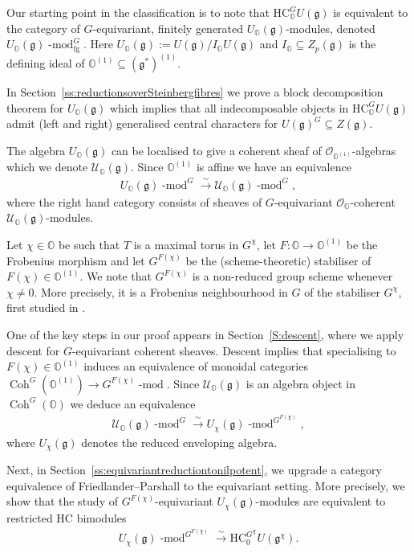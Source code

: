 \documentclass[twoside,12pt,reqno]{amsart}
\theoremstyle{remark}
\numberwithin{equation}{section}
\def\isoto{\overset{\sim}{\longrightarrow}}
\def\lmod{\!\operatorname{-mod}}
\def\Coh{\operatorname{Coh}}
\def\O{{\mathbb O}}
\def\HC{\mathrm{HC}}
\def\g{{\mathfrak g}}
\def\U{\mathcal{U}}
\def\Oc{\mathcal{O}}
\newcommand{\fg}{\operatorname{fg}}
\begin{document}
Our starting point in the classification is to note that $\HC_\O^G U(\g)$ is equivalent to the category of $G$-equivariant, finitely generated $U_\O(\g)$-modules, denoted $U_\O(\g)\lmod^G_{\fg}$. Here $U_\O(\g) := U(\g) / I_\O U(\g)$ and $I_\O \subseteq Z_p(\g)$ is the defining ideal of $\O^{(1)} \subseteq (\g^*)^{(1)}$.

In Section~\ref{ss:reductionsoverSteinbergfibres} we prove a block decomposition theorem for $U_\O(\g)$ which implies that all indecomposable objects in $\HC_\O^G U(\g)$ admit (left and right) generalised central characters for $U(\g)^G \subseteq Z(\g)$.

The algebra $U_\O(\g)$ can be localised to give a coherent sheaf of $\Oc_{\O^{(1)}}$-algebras which we denote $\U_\O(\g)$. Since $\O^{(1)}$ is affine we have an equivalence
\begin{eqnarray}
\label{eq:intro1}
U_\O(\g)\lmod^G \isoto \U_\O(\g)\lmod^G,    
\end{eqnarray}
where the right hand category consists of sheaves of $G$-equivariant $\Oc_\O$-coherent $\U_\O(\g)$-modules.

Let $\chi \in \O$ be such that $T$ is a maximal torus in $G^\chi$, let $F : \O \to \O^{(1)}$ be the Frobenius morphism and let $G^{F(\chi)}$ be the (scheme-theoretic) stabiliser of $F(\chi) \in \O^{(1)}$. We note that $G^{F(\chi)}$ is a non-reduced group scheme whenever $\chi \ne 0$. More precisely, it is a Frobenius neighbourhood in $G$ of the stabiliser $G^\chi$, first studied in \cite[]{ATW}.

One of the key steps in our proof appears in Section~\ref{S:descent}, where we apply descent for $G$-equivariant coherent sheaves. Descent implies that specialising to $F(\chi)\in \O^{(1)}$ induces an equivalence of monoidal categories $\Coh^G(\O^{(1)}) \to G^{F(\chi)}\lmod$. Since $\U_\O(\g)$ is an algebra object in $\Coh^G(\O)$ we deduce an equivalence
\begin{eqnarray}
\label{eq:intro2}
\U_\O(\g)\lmod^G \isoto U_\chi(\g)\lmod^{G^{F(\chi)}},    
\end{eqnarray}
where $U_\chi(\g)$ denotes the reduced enveloping algebra.

Next, in Section~\ref{ss:equivariantreductiontonilpotent}, we upgrade a category equivalence of Friedlander--Parshall \cite[Theorem~3.2]{FP} to the equivariant setting. More precisely, we show that the study of $G^{F(\chi)}$-equivariant $U_\chi(\g)$-modules are equivalent to restricted HC bimodules
\begin{eqnarray}
\label{eq:intro3}
U_\chi(\g)\lmod^{G^{F(\chi)}} \isoto \HC_0^{G^\chi} U(\g^\chi). 
\end{eqnarray}
\end{document}
